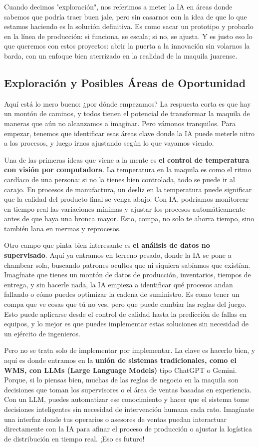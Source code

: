 Cuando decimos "exploración", nos referimos a meter la IA en áreas donde sabemos que podría traer buen jale, pero sin casarnos con la idea de que lo que estamos haciendo es la solución definitiva. Es como sacar un prototipo y probarlo en la línea de producción: si funciona, se escala; si no, se ajusta. Y es justo eso lo que queremos con estos proyectos: abrir la puerta a la innovación sin volarnos la barda, con un enfoque bien aterrizado en la realidad de la maquila juarense.

\subsection{Exploración y Posibles Áreas de Oportunidad}

Aquí está lo mero bueno: ¿por dónde empezamos? La respuesta corta es que hay un montón de caminos, y todos tienen el potencial de transformar la maquila de maneras que aún no alcanzamos a imaginar. Pero vámonos tranquilos. Para empezar, tenemos que identificar esas áreas clave donde la IA puede meterle nitro a los procesos, y luego irnos ajustando según lo que vayamos viendo.

Una de las primeras ideas que viene a la mente es \textbf{el control de temperatura con visión por computadora}. La temperatura en la maquila es como el ritmo cardíaco de una persona: si no la tienes bien controlada, todo se puede ir al carajo. En procesos de manufactura, un desliz en la temperatura puede significar que la calidad del producto final se venga abajo. Con IA, podríamos monitorear en tiempo real las variaciones mínimas y ajustar los procesos automáticamente antes de que haya una bronca mayor. Esto, compa, no solo te ahorra tiempo, sino también lana en mermas y reprocesos.

Otro campo que pinta bien interesante es \textbf{el análisis de datos no supervisado}. Aquí ya entramos en terreno pesado, donde la IA se pone a chambear sola, buscando patrones ocultos que ni siquiera sabíamos que existían. Imagínate que tienes un montón de datos de producción, inventarios, tiempos de entrega, y sin hacerle nada, la IA empieza a identificar qué procesos andan fallando o cómo puedes optimizar la cadena de suministro. Es como tener un compa que ve cosas que tú no ves, pero que puede cambiar las reglas del juego. Esto puede aplicarse desde el control de calidad hasta la predicción de fallas en equipos, y lo mejor es que puedes implementar estas soluciones sin necesidad de un ejército de ingenieros.

Pero no se trata solo de implementar por implementar. La clave es hacerlo bien, y aquí es donde entramos en la \textbf{unión de sistemas tradicionales, como el WMS, con LLMs (Large Language Models)} tipo ChatGPT o Gemini. Porque, si lo piensas bien, muchas de las reglas de negocio en la maquila son decisiones que toman los supervisores o el área de ventas basadas en experiencia. Con un LLM, puedes automatizar ese conocimiento y hacer que el sistema tome decisiones inteligentes sin necesidad de intervención humana cada rato. Imagínate una interfaz donde tus operarios o asesores de ventas puedan interactuar directamente con la IA para afinar el proceso de producción o ajustar la logística de distribución en tiempo real. ¡Eso es futuro!

